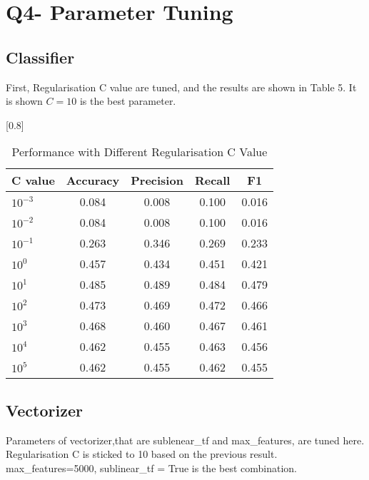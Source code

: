 \documentclass[a4paper,11pt]{article}
\begin{document}
\section{Q4- Parameter Tuning}
\subsection{Classifier}
First, Regularisation C value are tuned, and the results are shown in Table 5.
It is shown $C=10$ is the best parameter.%

\begin{table}[htbp]
    \centering
    \caption{Performance with Different Regularisation C Value}
    \small
    \scalebox{0.8}[0.8]{
    \begin{tabular}{l|cccc}
        C value & Accuracy & Precision & Recall & F1 \\ \hline 
        $10^{-3}$ &0.084 & 0.008& 0.100& 0.016\\ 
        $10^{-2}$ &0.084 &0.008 &0.100 &0.016\\ 
        $10^{-1}$ &0.263 &0.346 &0.269 &0.233\\ 
        $10^{0}$  &0.457 &0.434 &0.451 &0.421\\ 
        \rowcolor[rgb]{0.9,0.9,0}$10^{1}$  &0.485 &0.489 &0.484 &0.479\\ 
        $10^{2}$  &0.473 &0.469 &0.472 &0.466\\ 
        $10^{3}$  &0.468 &0.460 &0.467 &0.461\\ 
        $10^{4}$  &0.462 &0.455 &0.463 &0.456\\ 
        $10^{5}$  &0.462 &0.455 &0.462 &0.455\\ 

    \end{tabular}
    }
\end{table}
\subsection{Vectorizer}
Parameters of vectorizer,that are sublenear\_tf and max\_features, are tuned here.
Regularisation C is sticked to 10 based on the previous result.
max\_features=5000, sublinear\_tf = True is the best combination.
\end{document}
